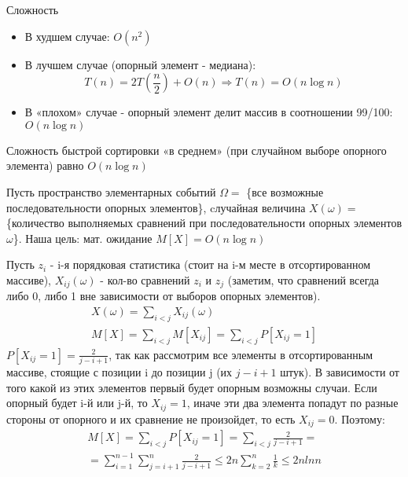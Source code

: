 \noindent Сложность
\begin{itemize}
    \item В худшем случае: $O(n^2)$
    \item В лучшем случае (опорный элемент - медиана):
    $$
    T(n) = 2T(\frac{n}{2})+ O(n) \Rightarrow T(n) = O(n \log n)
    $$
    \item В «плохом» случае - опорный элемент делит массив в соотношении 99/100: $O(n \log n)$
\end{itemize}

 Сложность быстрой сортировки «в среднем» (при случайном выборе опорного элемента) равно $O (n \log n)$

Пусть пространство элементарных событий $\Omega =$ \{все возможные последовательности опорных элементов\}, cлучайная величина $X(\omega) =$ \{количество выполняемых сравнений при последовательности опорных элементов $\omega$\}. Наша цель: мат. ожидание $M[X] = O (n \log n)$

\noindent Пусть $z_i$ - i-я порядковая статистика (стоит на i-м месте в отсортированном массиве), $X_{ij} (\omega)$ - кол-во сравнений $z_i$ и $z_j$ (заметим, что сравнений всегда либо 0, либо 1 вне зависимости от выборов опорных элементов). \\ 
\begin{equation*}
\begin{array}{c}
X(\omega) = \sum\limits_{i<j} X_{ij}(\omega) \\
M[X] = \sum\limits_{i<j} M[X_{ij}] = \sum\limits_{i<j} P[X_{ij} = 1]
\end{array}
\end{equation*}
$P[X_{ij} = 1] = \frac{2}{j - i + 1}$, так как рассмотрим все элементы в отсортированным массиве, стоящие с позиции i до позиции j (их $j - i + 1$ штук). В зависимости от того какой из этих элементов первый будет опорным возможны случаи. Если опорный будет i-й или j-й, то $X_{ij} = 1$, иначе эти два элемента попадут по разные стороны от опорного и их сравнение не произойдет, то есть $X_{ij} = 0$. Поэтому:
\begin{equation*}
\begin{array}{c}
M[X] = \sum\limits_{i<j} P[X_{ij} = 1] = \sum\limits_{i<j} \frac{2}{j - i + 1} = \\ 
= \sum\limits_{i=1}^{n-1} \sum\limits_{j=i+1}^{n} \frac{2}{j - i + 1}
\le 2n \sum\limits_{k=2}^{n} \frac 1 k \le 2nlnn
\end{array}
\end{equation*}

